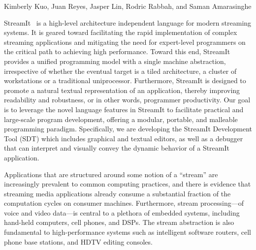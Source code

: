 \documentclass{csailabstractbook}
\begin{document}


         {Kimberly Kuo, Juan Reyes, Jasper Lin, Rodric Rabbah, and Saman Amarasinghe}



StreamIt~\cite{streamitcc}  is a  high-level  architecture independent
language  for   modern  streaming   systems.   It  is   geared  toward
facilitating   the   rapid   implementation   of   complex   streaming
applications and  mitigating the need for  expert-level programmers on
the  critical path to  achieving high  performance.  Toward  this end,
StreamIt provides  a unified programming  model with a  single machine
abstraction,  irrespective of whether  the eventual  target is  a tiled
architecture, a cluster of workstations or a traditional uniprocessor.
Furthermore,  StreamIt  is  designed  to  promote  a  natural  textual
representation  of an application,  thereby improving  readability and
robustness, or  in other words, programmer productivity.   Our goal is
to leverage  the novel language  features in StreamIt to facilitate  practical and
large-scale  program development,  offering a  modular,  portable, and
malleable programming  paradigm.  Specifically, we  are developing the
StreamIt Development  Tool (SDT) which includes  graphical and textual
editors, as well as a  debugger that can interpret and visually convey
the dynamic behavior of a StreamIt application.


Applications that  are structured around  some notion of  a ``stream''
are increasingly prevalent to common computing practices, and there is
evidence   that  streaming  media   applications  already   consume  a
substantial fraction  of the computation cycles  on consumer machines.
Furthermore, stream processing---of  voice and video data---is central
to a plethora of embedded systems, including hand-held computers, cell
phones,  and  DSPs. The  stream  abstraction  is  also fundamental  to
high-performance  systems such as  intelligent software  routers, cell
phone base stations, and HDTV editing consoles.
\end{document}
